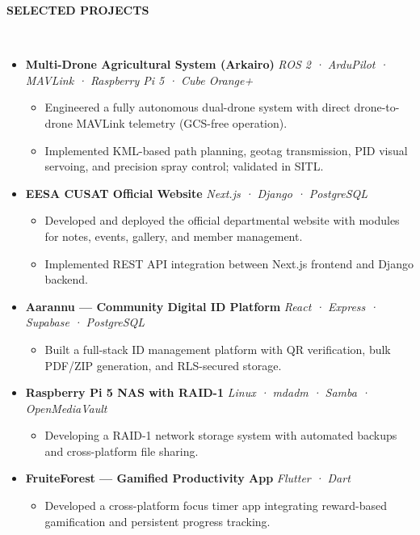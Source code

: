 \documentclass[10pt,a4paper]{article}
\newcommand{\resheading}[1]{{\small \colorbox{mygrey}{\begin{minipage}{0.99\textwidth}{\textbf{#1 \vphantom{p\^{E}}}}\end{minipage}}}}
\begin{document}
\noindent
\resheading{\textbf{SELECTED PROJECTS}}\\[-0.1cm]
\begin{itemize}[noitemsep,nolistsep]

\item \textbf{Multi-Drone Agricultural System (Arkairo)}  
\textit{ROS 2 · ArduPilot · MAVLink · Raspberry Pi 5 · Cube Orange+}  
\begin{itemize}[noitemsep]
    \item Engineered a fully autonomous dual-drone system with direct drone-to-drone MAVLink telemetry (GCS-free operation).
    \item Implemented KML-based path planning, geotag transmission, PID visual servoing, and precision spray control; validated in SITL.
\end{itemize}

\item \textbf{EESA CUSAT Official Website}  
\textit{Next.js · Django · PostgreSQL}  
\begin{itemize}[noitemsep]
    \item Developed and deployed the official departmental website with modules for notes, events, gallery, and member management.
    \item Implemented REST API integration between Next.js frontend and Django backend.
\end{itemize}

\item \textbf{Aarannu — Community Digital ID Platform}  
\textit{React · Express · Supabase · PostgreSQL}  
\begin{itemize}[noitemsep]
    \item Built a full-stack ID management platform with QR verification, bulk PDF/ZIP generation, and RLS-secured storage.
\end{itemize}

\item \textbf{Raspberry Pi 5 NAS with RAID-1}  
\textit{Linux · mdadm · Samba · OpenMediaVault}  
\begin{itemize}[noitemsep]
    \item Developing a RAID-1 network storage system with automated backups and cross-platform file sharing.
\end{itemize}

\item \textbf{FruiteForest — Gamified Productivity App}  
\textit{Flutter · Dart}  
\begin{itemize}[noitemsep]
    \item Developed a cross-platform focus timer app integrating reward-based gamification and persistent progress tracking.
\end{itemize}

\end{itemize}
\end{document}
